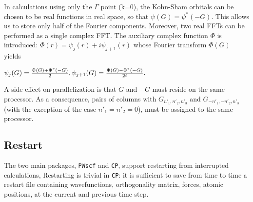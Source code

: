 \documentclass[12pt,a4paper]{article}
\begin{document}
In calculations using only the $\Gamma$ point (k=0),
the Kohn-Sham orbitals can be chosen to be real functions in
real space, so that
$
  \psi(G) = \psi^*(-G).
$
This allows us to store only half of the Fourier components.
Moreover, two real FFTs can be performed as a single complex FFT.
The auxiliary complex function $\Phi$ is introduced:
$
    \Phi(r) = \psi_j(r)+ i \psi_{j+1}(r)
$
whose Fourier transform $\Phi(G)$ yields

$
   \psi_j    (G) =  {\Phi(G) + \Phi^*(-G)\over 2},
   \psi_{j+1}(G) =  {\Phi(G) - \Phi^*(-G)\over 2i}.
$

A side effect on parallelization is that $G$ and $-G$ must
reside on the same processor. As a consequence, pairs of columns
with $G_{n'_1,n'_2,n'_3}$ and $G_{-n'_1,-n'_2,n'_3}$
(with the exception of the case $n'_1=n'_2=0$),
must be assigned to the same processor.

\subsection{Restart}

The two main packages, \texttt{PWscf} and \texttt{CP}, support
restarting from interrupted calculations, Restarting is trivial
in \texttt{CP}: it is sufficient to save from time to time a
restart file containing wavefunctions, orthogonality matrix,
forces, atomic positions, at the current and previous time step.
\end{document}
